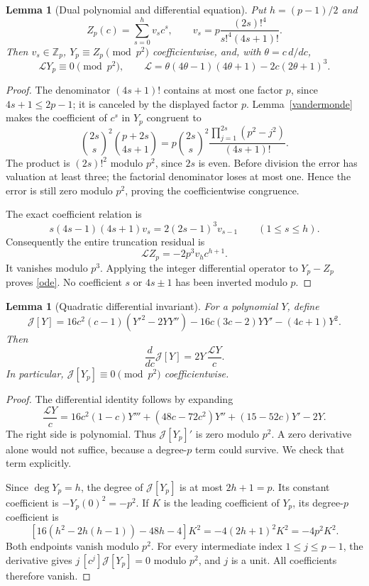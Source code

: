 \documentclass[11pt,a4paper]{article}
\newtheorem{lemma}[theorem]{Lemma}
\theoremstyle{remark}\newtheorem{remark}[theorem]{Remark}
\newcommand{\Z}{\mathbb Z}
\begin{document}
\begin{lemma}[Dual polynomial and differential equation]\label{dual}
Put \(h=(p-1)/2\) and
\[
 Z_p(c)=\sum_{s=0}^{h}v_s c^s,\qquad
 v_s=p\frac{(2s)!^4}{s!^4(4s+1)!}.
\]
Then \(v_s\in\Z_p\), \(Y_p\equiv Z_p\pmod {p^2}\) coefficientwise,
and, with \(\theta=c\,d/dc\),
\begin{equation}\label{ode}
 \mathcal L Y_p\equiv0\pmod {p^2},\qquad
 \mathcal L=\theta(4\theta-1)(4\theta+1)-2c(2\theta+1)^3 .
\end{equation}
\end{lemma}
\begin{proof}
The denominator \((4s+1)!\) contains at most one factor \(p\),
since \(4s+1\le2p-1\); it is canceled by the displayed factor \(p\).
Lemma~\ref{vandermonde} makes the coefficient of \(c^s\) in \(Y_p\)
congruent to
\[
 \binom{2s}s^2\binom{p+2s}{4s+1}
 =
 p\binom{2s}s^2
       \frac{\prod_{j=1}^{2s}(p^2-j^2)}{(4s+1)!}.
\]
The product is \((2s)!^2\) modulo \(p^2\), since \(2s\) is even.
Before division the error has valuation at least three; the factorial
denominator loses at most one. Hence the error is still zero modulo
\(p^2\), proving the coefficientwise congruence.

The exact coefficient relation is
\[
 s(4s-1)(4s+1)v_s=2(2s-1)^3v_{s-1}\qquad(1\le s\le h).
\]
Consequently the entire truncation residual is
\[
             \mathcal L Z_p=-2p^3v_h c^{h+1}.
\]
It vanishes modulo \(p^3\). Applying the integer differential operator
to \(Y_p-Z_p\) proves \eqref{ode}. No coefficient \(s\) or \(4s\pm1\)
has been inverted modulo \(p\).
\end{proof}

\begin{lemma}[Quadratic differential invariant]\label{invariant}
For a polynomial \(Y\), define
\[
 \mathcal J[Y]=16c^2(c-1)(Y'^2-2YY'')
              -16c(3c-2)YY'-(4c+1)Y^2.
\]
Then
\[
             \frac{d}{dc}\mathcal J[Y]=2Y\,\frac{\mathcal LY}{c}.
\]
In particular, \(\mathcal J[Y_p]\equiv0\pmod {p^2}\) coefficientwise.
\end{lemma}
\begin{proof}
The differential identity follows by expanding
\[
 \frac{\mathcal LY}{c}
 =16c^2(1-c)Y'''+(48c-72c^2)Y''
                  +(15-52c)Y'-2Y.
\]
The right side is polynomial. Thus \(\mathcal J[Y_p]'\) is zero
modulo \(p^2\). A zero derivative alone would not suffice, because a
degree-\(p\) term could survive. We check that term explicitly.

Since \(\deg Y_p=h\), the degree of \(\mathcal J[Y_p]\) is at most
\(2h+1=p\). Its constant coefficient is \(-Y_p(0)^2=-p^2\).
If \(K\) is the leading coefficient of \(Y_p\), its degree-\(p\)
coefficient is
\[
 [16(h^2-2h(h-1))-48h-4]K^2
                   =-4(2h+1)^2K^2=-4p^2K^2.
\]
Both endpoints vanish modulo \(p^2\). For every intermediate index
\(1\le j\le p-1\), the derivative gives \(j\, [c^j]\mathcal J[Y_p]=0\)
modulo \(p^2\), and \(j\) is a unit. All coefficients therefore vanish.
\end{proof}
\end{document}
